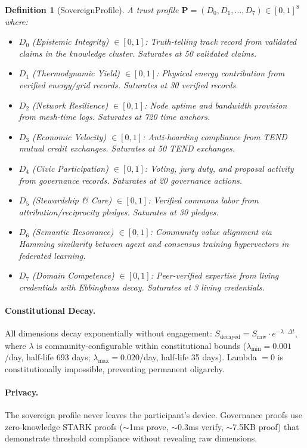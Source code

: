 \documentclass[12pt]{book}
\newtheorem{definition}{Definition}[chapter]
\begin{document}
\begin{definition}[SovereignProfile]
A trust profile $\mathbf{P} = (D_0, D_1, \ldots, D_7) \in [0,1]^8$ where:
\begin{itemize}
  \item $D_0$ (Epistemic Integrity) $\in [0,1]$: Truth-telling track record from validated claims in the knowledge cluster. Saturates at 50 validated claims.
  \item $D_1$ (Thermodynamic Yield) $\in [0,1]$: Physical energy contribution from verified energy/grid records. Saturates at 30 verified records.
  \item $D_2$ (Network Resilience) $\in [0,1]$: Node uptime and bandwidth provision from mesh-time logs. Saturates at 720 time anchors.
  \item $D_3$ (Economic Velocity) $\in [0,1]$: Anti-hoarding compliance from TEND mutual credit exchanges. Saturates at 50 TEND exchanges.
  \item $D_4$ (Civic Participation) $\in [0,1]$: Voting, jury duty, and proposal activity from governance records. Saturates at 20 governance actions.
  \item $D_5$ (Stewardship \& Care) $\in [0,1]$: Verified commons labor from attribution/reciprocity pledges. Saturates at 30 pledges.
  \item $D_6$ (Semantic Resonance) $\in [0,1]$: Community value alignment via Hamming similarity between agent and consensus training hypervectors in federated learning.
  \item $D_7$ (Domain Competence) $\in [0,1]$: Peer-verified expertise from living credentials with Ebbinghaus decay. Saturates at 3 living credentials.
\end{itemize}
\end{definition}

\paragraph{Constitutional Decay.} All dimensions decay exponentially without engagement: $S_{\text{decayed}} = S_{\text{raw}} \cdot e^{-\lambda \cdot \Delta t}$, where $\lambda$ is community-configurable within constitutional bounds ($\lambda_{\min} = 0.001$/day, half-life 693 days; $\lambda_{\max} = 0.020$/day, half-life 35 days). Lambda $= 0$ is constitutionally impossible, preventing permanent oligarchy.

\paragraph{Privacy.} The sovereign profile never leaves the participant's device. Governance proofs use zero-knowledge STARK proofs ($\sim$1ms prove, $\sim$0.3ms verify, $\sim$7.5KB proof) that demonstrate threshold compliance without revealing raw dimensions.
\end{document}
